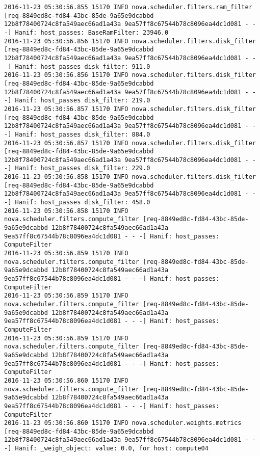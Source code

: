 \begin{lstlisting}[frame=single, caption={The cPlex based scheduler log trace for 10 virtual instances}, label={lst:tucschedulercodetracelog10vi}, escapechar=|]
2016-11-23 05:30:56.855 15170 INFO nova.scheduler.filters.ram_filter [req-8849ed8c-fd84-43bc-85de-9a65e9dcabbd 12b8f78400724c8fa549aec66ad1a43a 9ea57ff8c67544b78c8096ea4dc1d081 - - -] Hanif: host_passes: BaseRamFilter: 23946.0
2016-11-23 05:30:56.856 15170 INFO nova.scheduler.filters.disk_filter [req-8849ed8c-fd84-43bc-85de-9a65e9dcabbd 12b8f78400724c8fa549aec66ad1a43a 9ea57ff8c67544b78c8096ea4dc1d081 - - -] Hanif: host_passes disk_filter: 911.0
2016-11-23 05:30:56.856 15170 INFO nova.scheduler.filters.disk_filter [req-8849ed8c-fd84-43bc-85de-9a65e9dcabbd 12b8f78400724c8fa549aec66ad1a43a 9ea57ff8c67544b78c8096ea4dc1d081 - - -] Hanif: host_passes disk_filter: 219.0
2016-11-23 05:30:56.857 15170 INFO nova.scheduler.filters.disk_filter [req-8849ed8c-fd84-43bc-85de-9a65e9dcabbd 12b8f78400724c8fa549aec66ad1a43a 9ea57ff8c67544b78c8096ea4dc1d081 - - -] Hanif: host_passes disk_filter: 884.0
2016-11-23 05:30:56.857 15170 INFO nova.scheduler.filters.disk_filter [req-8849ed8c-fd84-43bc-85de-9a65e9dcabbd 12b8f78400724c8fa549aec66ad1a43a 9ea57ff8c67544b78c8096ea4dc1d081 - - -] Hanif: host_passes disk_filter: 229.0
2016-11-23 05:30:56.858 15170 INFO nova.scheduler.filters.disk_filter [req-8849ed8c-fd84-43bc-85de-9a65e9dcabbd 12b8f78400724c8fa549aec66ad1a43a 9ea57ff8c67544b78c8096ea4dc1d081 - - -] Hanif: host_passes disk_filter: 458.0
2016-11-23 05:30:56.858 15170 INFO nova.scheduler.filters.compute_filter [req-8849ed8c-fd84-43bc-85de-9a65e9dcabbd 12b8f78400724c8fa549aec66ad1a43a 9ea57ff8c67544b78c8096ea4dc1d081 - - -] Hanif: host_passes: ComputeFilter
2016-11-23 05:30:56.859 15170 INFO nova.scheduler.filters.compute_filter [req-8849ed8c-fd84-43bc-85de-9a65e9dcabbd 12b8f78400724c8fa549aec66ad1a43a 9ea57ff8c67544b78c8096ea4dc1d081 - - -] Hanif: host_passes: ComputeFilter
2016-11-23 05:30:56.859 15170 INFO nova.scheduler.filters.compute_filter [req-8849ed8c-fd84-43bc-85de-9a65e9dcabbd 12b8f78400724c8fa549aec66ad1a43a 9ea57ff8c67544b78c8096ea4dc1d081 - - -] Hanif: host_passes: ComputeFilter
2016-11-23 05:30:56.859 15170 INFO nova.scheduler.filters.compute_filter [req-8849ed8c-fd84-43bc-85de-9a65e9dcabbd 12b8f78400724c8fa549aec66ad1a43a 9ea57ff8c67544b78c8096ea4dc1d081 - - -] Hanif: host_passes: ComputeFilter
2016-11-23 05:30:56.860 15170 INFO nova.scheduler.filters.compute_filter [req-8849ed8c-fd84-43bc-85de-9a65e9dcabbd 12b8f78400724c8fa549aec66ad1a43a 9ea57ff8c67544b78c8096ea4dc1d081 - - -] Hanif: host_passes: ComputeFilter
2016-11-23 05:30:56.860 15170 INFO nova.scheduler.weights.metrics [req-8849ed8c-fd84-43bc-85de-9a65e9dcabbd 12b8f78400724c8fa549aec66ad1a43a 9ea57ff8c67544b78c8096ea4dc1d081 - - -] Hanif: _weigh_object: value: 0.0, for host: compute04

\end{lstlisting}
